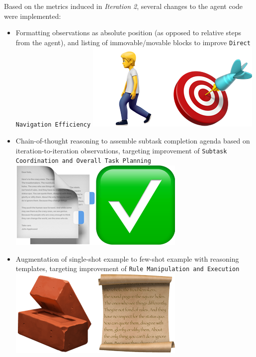 Based on the metrics induced in \emph{Iteration 2}, several changes to the agent
code were implemented:
\begin{itemize}
	\item Formatting observations as absolute position (as opposed to relative
		steps from the agent), and listing of immovable/movable blocks to improve
		\texttt{Direct Navigation Efficiency}
		\includegraphics[scale=0.07]{figs/emojis/emoji_3.png}

	\item Chain-of-thought reasoning to assemble subtask completion agenda based on
		iteration-to-iteration observations, targeting improvement of \texttt{Subtask
		Coordination and Overall Task Planning}
		\includegraphics[scale=0.07]{figs/emojis/emoji_8.png}

	\item Augmentation of single-shot example to few-shot example with reasoning templates,
		targeting improvement of \texttt{Rule Manipulation and Execution}
		\includegraphics[scale=0.07]{figs/emojis/emoji_7.png}


\end{itemize}
